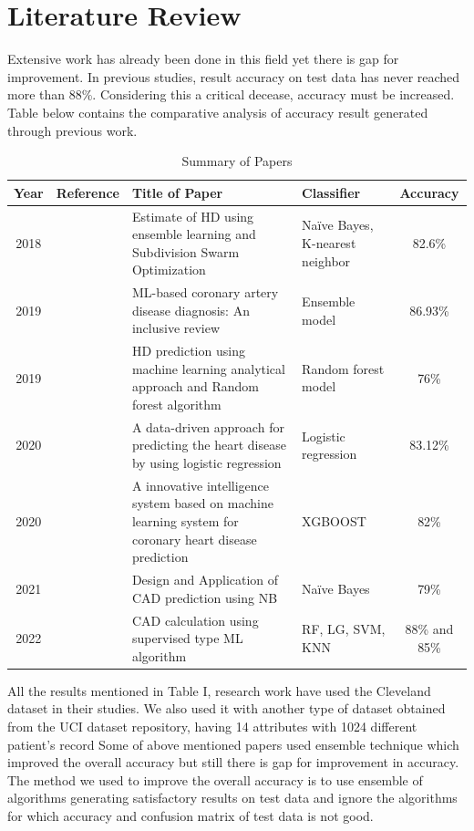 \documentclass[journal, twoside, final]{IEEEtran}
\begin{document}
\section{Literature Review}
Extensive work has already been done in this field yet there is gap for improvement. In previous studies, result accuracy on test data has never reached more than 88\%. Considering this a critical decease, accuracy must be increased. Table below contains the comparative analysis of accuracy result generated through previous work.


\begin{table}[htbp]
  \caption{Summary of Papers}
  \centering
  \begin{tabular}{|c|c|p{4cm}|p{4cm}|c|}
    \hline
    \textbf{Year} & \textbf{Reference} & \textbf{Title of Paper} & \textbf{Classifier} & \textbf{Accuracy} \\
    \hline
    2018 & \cite{yekkala2017prediction} & Estimate of HD using ensemble learning and Subdivision Swarm Optimization & Naïve Bayes, K-nearest neighbor & 82.6\% \\
   \hline
    2019 &\cite{alizadehsani2019machine} & ML-based coronary artery disease diagnosis: An inclusive review & Ensemble model & 86.93\% \\
   \hline
    2019 & \cite{abdar2019performance} & HD prediction using machine learning analytical approach and Random forest algorithm & Random forest model & 76\% \\
   \hline
    2020 & \cite{mienye2020improved} & A data-driven approach for predicting the heart disease by using logistic regression & Logistic regression & 83.12\% \\
   \hline
    2020 & \cite{chang2019new} & A innovative intelligence system based on machine learning system for coronary heart disease prediction & XGBOOST & 82\% \\
   \hline
    2021 & \cite{shorewala2021early} & Design and Application of CAD prediction using NB & Naïve Bayes & 79\% \\
   \hline
    2022 & \cite{ahmad2022comparative} & CAD calculation using supervised type ML algorithm & RF, LG, SVM, KNN & 88\% and 85\% \\

    \hline
  \end{tabular}
\end{table}

All the results mentioned in Table I, research work have used the Cleveland dataset in their studies. We also used it with another type of dataset obtained from the UCI dataset repository, having 14 attributes with 1024 different patient’s record
Some of above mentioned papers used ensemble technique which improved the overall accuracy but still there is gap for improvement in accuracy. The method we used to improve the overall accuracy is to use ensemble of algorithms generating satisfactory results on test data and ignore the algorithms for which accuracy and confusion matrix of test data is not good.
\end{document}
